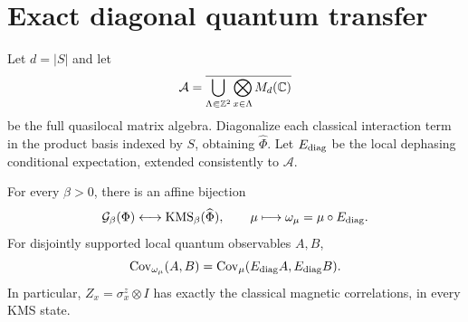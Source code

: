 \section{Exact diagonal quantum transfer}\label{sec:quantum}

Let \(d=|S|\) and let
\begin{equation}
 \mathcal A=\overline{\bigcup_{\Lambda\Subset\mathbb Z^2}
                \bigotimes_{x\in\Lambda}M_d(\mathbb C)}
\end{equation}
be the full quasilocal matrix algebra. Diagonalize each classical interaction term in the product basis indexed by \(S\), obtaining \(\widehat\Phi\). Let \(E_{\mathrm{diag}}\) be the local dephasing conditional expectation, extended consistently to \(\mathcal A\).

\begin{remark}\label{thm:KMS}
For every \(\beta>0\), there is an affine bijection
\begin{equation}
 \mathcal G_\beta(\Phi)\longleftrightarrow\mathrm{KMS}_\beta(\widehat\Phi),
 \qquad \mu\longmapsto\omega_\mu=\mu\circ E_{\mathrm{diag}}.
 \label{eq:KMSbijection}
\end{equation}
For disjointly supported local quantum observables \(A,B\),
\begin{equation}
 \operatorname{Cov}_{\omega_\mu}(A,B)
 =\operatorname{Cov}_\mu(E_{\mathrm{diag}}A,E_{\mathrm{diag}}B).
 \label{eq:quantumcov}
\end{equation}
In particular, \(Z_x=\sigma_x^z\otimes I\) has exactly the classical magnetic correlations, in every KMS state.
\end{remark}
